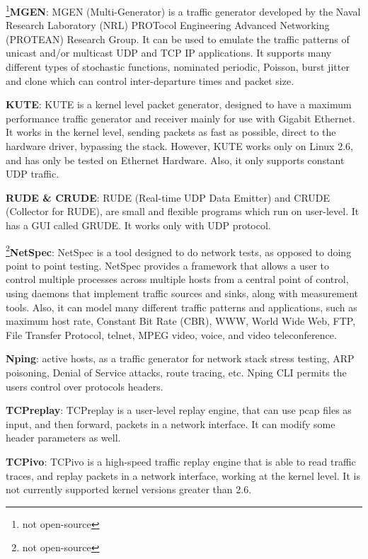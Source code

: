 \footnote{not open-source}\textbf{MGEN}\cite{web-mgen}: MGEN (Multi-Generator) is a traffic generator developed by the Naval Research Laboratory (NRL) PROTocol Engineering Advanced Networking (PROTEAN) Research Group. It can be used to emulate the traffic patterns of unicast and/or multicast UDP and TCP IP applications. It supports many different types of stochastic functions, nominated periodic, Poisson, burst jitter and clone which can control inter-departure times and packet size. 

\textbf{KUTE}\cite{web-kute}: KUTE is a kernel level packet generator, designed to have a maximum performance traffic generator and receiver mainly for use with Gigabit Ethernet. It works in the kernel level, sending packets as fast as possible, direct to the hardware driver, bypassing the stack. However, KUTE works only on Linux 2.6, and has only be tested on Ethernet Hardware. Also, it only supports constant UDP traffic. 


\textbf{RUDE \& CRUDE}\cite{web-rude-crude}: RUDE (Real-time UDP Data Emitter) and CRUDE (Collector for RUDE), are small and flexible programs which run on user-level. It has a GUI called GRUDE. It works only with UDP protocol.

\footnote{not open-source}\textbf{NetSpec}\cite{web-netspec}: NetSpec is a tool designed to do network tests, as opposed to doing point to point testing. NetSpec provides a framework that allows a user to control multiple processes across multiple hosts from a central point of control, using daemons that implement traffic sources and sinks, along with measurement tools. Also, it can model many different traffic patterns and applications, such as maximum host rate, Constant Bit Rate (CBR), WWW, World Wide Web, FTP, File Transfer Protocol, telnet, MPEG video, voice, and video teleconference. 


\textbf{Nping}\cite{web-nping}: active hosts, as a traffic generator for network stack stress testing, ARP poisoning, Denial of Service attacks, route tracing, etc. Nping CLI permits the users control over protocols headers. 

\textbf{TCPreplay}\cite{web-tcpreplay}: TCPreplay is a user-level replay engine, that can use pcap files as input, and then forward, packets in a network interface. It can modify some header parameters as well. 


\textbf{TCPivo}\cite{tcpivo-paper}\cite{web-tcpivo}: TCPivo is a high-speed traffic replay engine that is able to read traffic traces, and replay packets in a network interface, working at the kernel level. It is not currently supported kernel versions greater than 2.6. 

